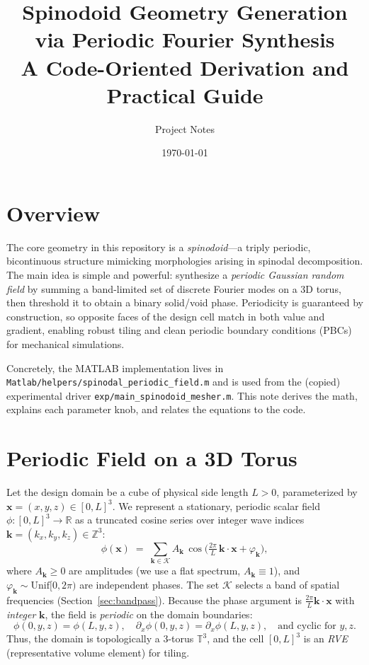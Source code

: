 \documentclass[11pt,a4paper]{article}
\title{Spinodoid Geometry Generation via Periodic Fourier Synthesis\\\large A Code-Oriented Derivation and Practical Guide}
\author{Project Notes}
\date{\today}
\newcommand{\R}{\mathbb{R}}
\newcommand{\Z}{\mathbb{Z}}
\newcommand{\vx}{\bm{x}}
\newcommand{\vk}{\bm{k}}
\newcommand{\T}{\mathbb{T}}
\begin{document}
\maketitle

\section{Overview}
The core geometry in this repository is a \emph{spinodoid}---a triply periodic, bicontinuous structure mimicking morphologies arising in spinodal decomposition. The main idea is simple and powerful: synthesize a \emph{periodic Gaussian random field} by summing a band-limited set of discrete Fourier modes on a 3D torus, then threshold it to obtain a binary solid/void phase. Periodicity is guaranteed by construction, so opposite faces of the design cell match in both value and gradient, enabling robust tiling and clean periodic boundary conditions (PBCs) for mechanical simulations.

Concretely, the MATLAB implementation lives in \texttt{Matlab/helpers/spinodal\_periodic\_field.m} and is used from the (copied) experimental driver \texttt{exp/main\_spinodoid\_mesher.m}. This note derives the math, explains each parameter knob, and relates the equations to the code.

\section{Periodic Field on a 3D Torus}
Let the design domain be a cube of physical side length $L>0$, parameterized by $\vx=(x,y,z)\in[0,L]^3$. We represent a stationary, periodic scalar field $\phi: [0,L]^3\to\R$ as a truncated cosine series over integer wave indices $\vk=(k_x,k_y,k_z)\in\Z^3$:
\begin{equation}
\label{eq:phi}
\phi(\vx)\;=\;\sum_{\vk\in\mathcal{K}} A_{\vk}\,\cos\!\Big( \tfrac{2\pi}{L} \, \vk\cdot\vx + \varphi_{\vk} \Big),
\end{equation}
where $A_{\vk}\ge 0$ are amplitudes (we use a flat spectrum, $A_{\vk}\equiv 1$), and $\varphi_{\vk}\sim\mathrm{Unif}[0,2\pi)$ are independent phases. The set $\mathcal{K}$ selects a band of spatial frequencies (Section~\ref{sec:bandpass}). Because the phase argument is $\tfrac{2\pi}{L}\vk\cdot\vx$ with \emph{integer} $\vk$, the field is \emph{periodic} on the domain boundaries:
\begin{equation*}
\phi(0,y,z)=\phi(L,y,z),\quad \partial_x\phi(0,y,z)=\partial_x\phi(L,y,z),\quad \text{and cyclic for }y,z.
\end{equation*}
Thus, the domain is topologically a 3-torus $\T^3$, and the cell $[0,L]^3$ is an \emph{RVE} (representative volume element) for tiling.
\end{document}
